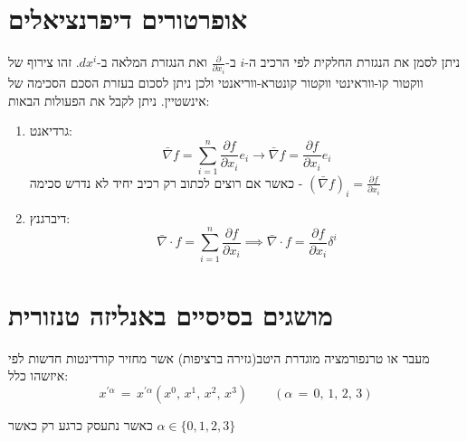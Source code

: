 \documentclass{tstextbook}
\begin{document}
\section{אופרטורים דיפרנציאלים}

ניתן לסמן את הנגזרת החלקית לפי הרכיב ה-\(i\) ב-\(\frac{\partial }{\partial x_{i}}\) ואת הנגזרת המלאה ב-\(dx^i\). זהו צירוף של ווקטור קו-ווראינטי ווקטור קונטרא-ווריאנטי ולכן ניתן לסכום בעזרת הסכם הסכימה של אינשטיין. ניתן לקבל את הפעולות הבאות:

\begin{enumerate}
  \item גרדיאנט: 
$$\bar{\nabla} f = \sum_{i=1}^n \frac{\partial f}{\partial x_{i}} e_{i}\to \bar{\nabla} f=\frac{\partial f}{\partial x_{i}} e_{i}$$
כאשר אם רוצים לכתוב רק רכיב יחיד לא נדרש סכימה - \(\left( \bar{\nabla}f \right)_{i}=\frac{\partial f}{\partial x_{i}}\)


  \item דיברגנץ: 
$$\bar{\nabla} \cdot f = \sum_{i=1}^n \frac{\partial f}{\partial x_{i}} \implies \bar{\nabla} \cdot f=\frac{\partial f}{\partial x_{i}} \delta^i$$


\end{enumerate}
\section{מושגים בסיסיים באנליזה טנזורית}

\begin{definition}
מעבר או טרנפורמציה מוגדרת היטב(גזירה ברציפות) אשר מחזיר קורדינטות חדשות לפי איזשהו כלל:
$$x^{\prime\alpha}\,=\,x^{\prime\alpha}(x^{0},\,x^{1},\,x^{2},\,x^{3})\qquad(\alpha\,=\,0,\,1,\,2,\,3)$$

\end{definition}
כאשר נתעסק כרגע רק כאשר \(\alpha \in \{ 0,1,2,3 \}\)
\end{document}

